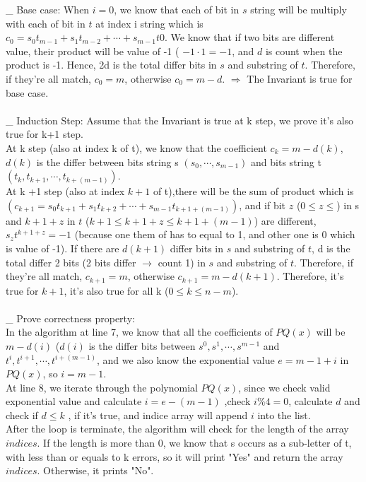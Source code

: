 \documentclass[11pt]{article}
\newenvironment{qparts}{\begin{enumerate}[{(}a{)}]}{\end{enumerate}}
\newcommand{\tab}{\hspace*{2em}}
\begin{document}
\begin{qparts}
\_ Base case:
When $i = 0$, we know that each of bit in $s$ string will be multiply with each of bit in $t$ at index i string which is $c_0 = s_0 t_{m-1} + s_1 t_{m-2} + \cdots + s_{m-1} t{0}$. We know that if two bits are different value, their product will be value of -1 ( $-1\cdot 1 = -1$, and $d$ is count when the product is -1. Hence, 2d is the total differ bits in $s$ and substring of $t$. Therefore, if they're all match, $c_0 = m$, otherwise $c_0 = m-d$. $\Rightarrow$ The Invariant is true for base case.\\
\\
\_ Induction Step: Assume that the Invariant is true at k step, we prove it's also true for k+1 step.\\
At k step (also at index k of t), we know that the coefficient $c_k = m-d(k)$, $d(k)$ is the differ between bits string s $(s_0, \cdots , s_{m-1})$ and bits string t $(t_{k}, t_{k + 1}, \cdots, t_{k + (m-1)} )$.\\
At k +1 step (also at index $k+1$ of t),there will be the sum of product which is $(c_{k+1} = s_0 t_{k+1} + s_1 t_{k+2} + \cdots + s_{m-1} t_{k+1 +(m-1)})$, and if bit $z$ ($0\leqslant z \leqslant$) in s and $k + 1 +z$ in $t$ ($k+1\leqslant k+1+ z  \leqslant k+1+(m-1)$) are different, $s_z t^{k+1+z} = -1$ (because one them of has to equal to 1, and other one is 0 which is value of -1). If there are $d(k+1)$ differ bits in $s$ and substring of $t$, d is the total differ 2 bits (2 bits differ $\to$ count 1) in $s$ and substring of $t$. Therefore, if they're all match, $c_{k+1} = m$, otherwise $c_{k+1} = m-d(k+1)$.
Therefore, it's true for $k+1$, it's also true for all k ($0\leqslant k \leqslant n-m$).\\
\\
\_ Prove correctness property:\\
\tab In the algorithm at line 7, we know that all the coefficients of $PQ(x)$ will be $m-d(i)$ ($d(i)$ is the differ bits between $s^0, s^1,\cdots, s^{m-1}$ and $t^{i}, t^{i+1},\cdots, t^{i+ (m-1)}$, and we also know the exponential value $e = m-1 + i$ in $PQ(x)$, so $i = m-1$.\\
At line 8, we iterate through the polynomial $PQ(x)$, since we check valid exponential value and calculate $i = e -(m-1)$ ,check $i\%4 = 0$, calculate $d$ and check if $d\leqslant k$ , if it's true, and indice array will append $i$ into the list.\\
After the loop is terminate, the algorithm will check for the length of the array $indices$. If the length is more than 0, we know that s occurs as a sub-letter of t, with less than or equals to k errors, so it will print "Yes" and return the array $indices$. Otherwise, it prints "No".

\end{qparts}
\end{document}
